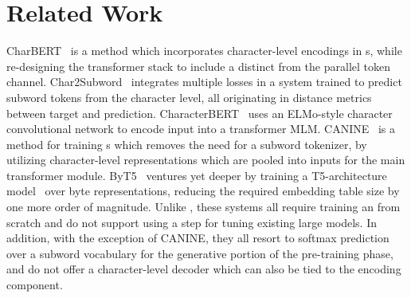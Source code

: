 \section{Related Work}
\label{sec:related}

CharBERT~\cite{ma-etal-2020-charbert} is a method which incorporates character-level encodings in \llm{}s, while re-designing the transformer stack to include a  distinct from the parallel token channel.
Char2Subword~\cite{aguilar2020char2subword} integrates multiple losses in a system trained to predict subword tokens from the character level, all originating in distance metrics between target and prediction.
CharacterBERT~\cite{el-boukkouri-etal-2020-characterbert} uses an ELMo-style character convolutional network to encode input into a transformer MLM.
CANINE~\cite{clark2021canine} is a method for training \llm{}s which removes the need for a subword tokenizer, by utilizing character-level representations which are pooled into inputs for the main transformer module.
ByT5~\cite{xue2021byt5} ventures yet deeper by training a T5-architecture model~\cite{raffel2020exploring} over byte representations, reducing the required embedding table size by one more order of magnitude.
Unlike \tokdetok{}, these systems all require training an \llm{} from scratch and do not support using a \ppt{} step for tuning existing large models.
In addition, with the exception of CANINE, they all resort to softmax prediction over a subword vocabulary for the generative portion of the pre-training phase, and do not offer a character-level decoder which can also be tied to the encoding component.



